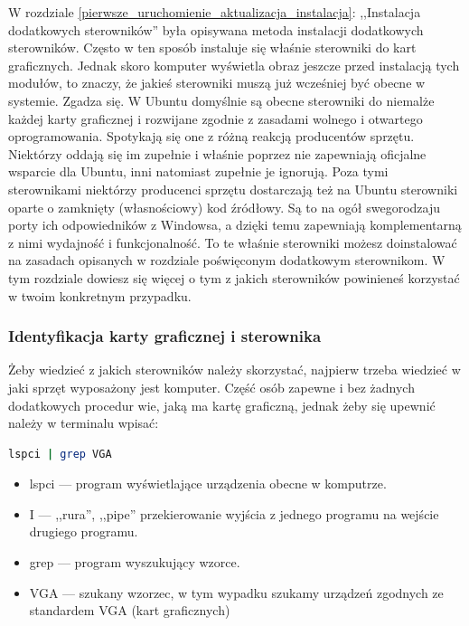\label{sterowniki}
W rozdziale \ref{pierwsze_uruchomienie_aktualizacja_instalacja}: ,,Instalacja dodatkowych sterowników'' była opisywana metoda instalacji dodatkowych sterowników. Często w ten sposób instaluje się właśnie sterowniki do kart graficznych. Jednak skoro komputer wyświetla obraz jeszcze przed instalacją tych modułów, to znaczy, że jakieś sterowniki muszą już wcześniej być obecne w systemie. Zgadza się. W Ubuntu domyślnie są obecne sterowniki do niemalże każdej karty graficznej i rozwijane zgodnie z zasadami wolnego i otwartego oprogramowania. Spotykają się one z różną reakcją producentów sprzętu. Niektórzy oddają się im zupełnie i właśnie poprzez nie zapewniają oficjalne wsparcie dla Ubuntu, inni natomiast zupełnie je ignorują. Poza tymi sterownikami niektórzy producenci sprzętu dostarczają też na Ubuntu sterowniki oparte o zamknięty (własnościowy) kod źródłowy. Są to na ogół swegorodzaju porty ich odpowiedników z Windowsa, a dzięki temu zapewniają komplementarną z nimi wydajność i funkcjonalność. To te właśnie sterowniki możesz doinstalować na zasadach opisanych w rozdziale poświęconym dodatkowym sterownikom. W tym rozdziale dowiesz się więcej o tym z jakich sterowników powinieneś korzystać w twoim konkretnym przypadku.

\subsubsection{Identyfikacja karty graficznej i sterownika}
Żeby wiedzieć z jakich sterowników należy skorzystać, najpierw trzeba wiedzieć w jaki sprzęt wyposażony jest komputer. Część osób zapewne i bez żadnych dodatkowych procedur wie, jaką ma kartę graficzną, jednak żeby się upewnić należy w terminalu wpisać:

\begin{lstlisting}[language=bash]
lspci | grep VGA
\end{lstlisting}
\begin{itemize}
\item \textcolor{ubuntu_orange}{lspci} --- program wyświetlające urządzenia obecne w komputrze.
\item \textcolor{ubuntu_orange}{I} --- ,,rura'', ,,pipe'' przekierowanie wyjścia z jednego programu na wejście drugiego programu. 
\item \textcolor{ubuntu_orange}{grep} --- program wyszukujący wzorce.
\item \textcolor{ubuntu_orange}{VGA} --- szukany wzorzec, w tym wypadku szukamy urządzeń zgodnych ze standardem VGA (kart graficznych)
\end{itemize}

